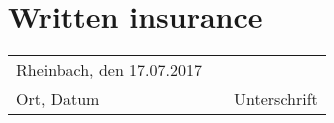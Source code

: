\documentclass[12pt,a4paper]{article}
\begin{document}

	
	
\renewcommand{\contentsname}{Table of Contents}
\newpage 								
\tableofcontents	
					      



\newpage

		




%	



	
\newpage
{} 		      %
\setcounter{page}{1}			  %





\newpage 								 
\medskip
\renewcommand{\bibname}{References}

   



\newpage
\section*{Written insurance}


\begin{tabular}{lp{2em}l}
	Rheinbach, den 17.07.2017   && 
	\\\cline{1-1}\cline{3-3}
	Ort, Datum     && Unterschrift
\end{tabular}
\end{document}
